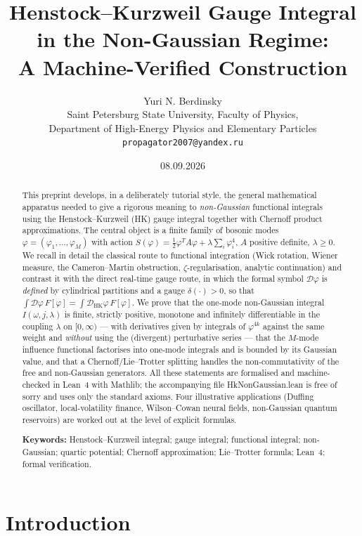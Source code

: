 \documentclass[11pt,a4paper]{article}
\title{\bfseries Henstock--Kurzweil Gauge Integral in the Non-Gaussian Regime:\\
A Machine-Verified Construction}
\author{Yuri N. Berdinsky\\[2mm]
\small Saint Petersburg State University, Faculty of Physics,\\
\small Department of High-Energy Physics and Elementary Particles\\
\small \texttt{propagator2007@yandex.ru}}
\date{08.09.2026}
\theoremstyle{plain}
\theoremstyle{definition}
\theoremstyle{remark}
\newcommand{\dphi}{\mathcal{D}\varphi}
\newcommand{\dhk}{\mathcal{D}_{\mathrm{HK}}\varphi}
\let\leanoldunderscore\_
\newcommand{\leanbreakunderscore}{\leanoldunderscore\allowbreak}
\newcommand{\lean}[1]{{\ttfamily\hyphenchar\font=-1\relax
  \let\_\leanbreakunderscore #1}}
\begin{document}
\sloppy
\setlength{\emergencystretch}{3em}
\maketitle

\begin{abstract}
\noindent
This preprint develops, in a deliberately tutorial style, the general mathematical
apparatus needed to give a rigorous meaning to \emph{non-Gaussian} functional integrals
using the Henstock--Kurzweil (HK) gauge integral together with Chernoff product
approximations. The central object is a finite family of bosonic modes
$\varphi=(\varphi_1,\dots,\varphi_M)$ with action
$S(\varphi)=\tfrac12\varphi^{T}A\varphi+\lambda\sum_i\varphi_i^4$, $A$ positive definite,
$\lambda\ge 0$. We recall in detail the classical route to functional integration
(Wick rotation, Wiener measure, the Cameron--Martin obstruction, $\zeta$-regularisation,
analytic continuation) and contrast it with the direct real-time gauge route, in which
the formal symbol $\dphi$ is \emph{defined} by cylindrical partitions and a gauge
$\delta(\cdot)>0$, so that $\int\dphi\,F[\varphi]=\int\dhk\,F[\varphi]$. We prove that
the one-mode non-Gaussian integral $I(\omega,j,\lambda)$ is finite, strictly positive,
monotone and infinitely differentiable in the coupling $\lambda$ on $[0,\infty)$ --- with
derivatives given by integrals of $\varphi^{4k}$ against the same weight and \emph{without}
using the (divergent) perturbative series --- that the $M$-mode influence functional
factorises into one-mode integrals and is bounded by its Gaussian value, and that a
Chernoff/Lie--Trotter splitting handles the non-commutativity of the free and
non-Gaussian generators. All these statements are formalised and machine-checked in
Lean~4 with Mathlib; the accompanying file \lean{HkNonGaussian.lean} is free of
\lean{sorry} and uses only the standard axioms. Four illustrative applications
(Duffing oscillator, local-volatility finance, Wilson--Cowan neural fields, non-Gaussian
quantum reservoirs) are worked out at the level of explicit formulas.

\medskip
\noindent\textbf{Keywords:} Henstock--Kurzweil integral; gauge integral; functional
integral; non-Gaussian; quartic potential; Chernoff approximation; Lie--Trotter formula;
Lean~4; formal verification.
\end{abstract}

\tableofcontents

\section{Introduction}
\label{sec:intro}
\end{document}

